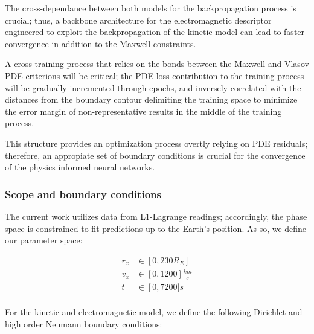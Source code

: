 \documentclass[12pt]{article}
\begin{document}
The cross-dependance between both models for the backpropagation process is crucial; thus, a backbone architecture for the electromagnetic descriptor engineered to exploit the backpropagation of the kinetic model can lead to faster convergence in addition to the Maxwell constraints.

A cross-training process that relies on the bonds between the Maxwell and Vlasov PDE criterions will be critical; the PDE loss contribution to the training process will be gradually incremented through epochs, and inversely correlated with the distances from the boundary contour delimiting the training space to minimize the error margin of non-representative results in the middle of the training process.

This structure provides an optimization process overtly relying on PDE residuals; therefore, an appropiate set of boundary conditions is crucial for the convergence of the physics informed neural networks.

\subsubsection{Scope and boundary conditions}
The current work utilizes data from L1-Lagrange readings; accordingly, the phase space is constrained to fit predictions up to the Earth's position. As so, we define our parameter space:

\begin{align*}
    r_x &\in \left[0, 230R_E\right] \\
    v_x &\in \left[0, 1200\right]\frac{km}{s} \\
    t &\in \left[0, 7200]s \\
\end{align*}

For the kinetic and electromagnetic model, we define the following Dirichlet and high order Neumann boundary conditions:
\end{document}
